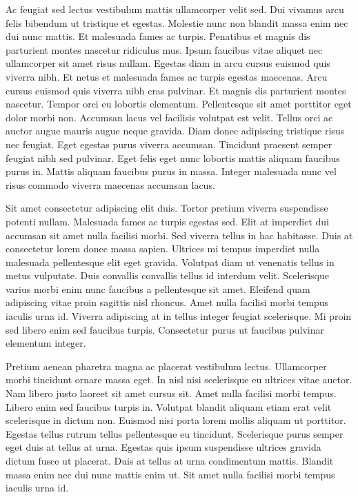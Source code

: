 \documentclass[a4paper,12pt,oneside]{article}
\begin{document}
Ac feugiat sed lectus vestibulum mattis ullamcorper velit sed. Dui vivamus arcu felis bibendum ut tristique et egestas. Molestie nunc non blandit massa enim nec dui nunc mattis. Et malesuada fames ac turpis. Penatibus et magnis dis parturient montes nascetur ridiculus mus. Ipsum faucibus vitae aliquet nec ullamcorper sit amet risus nullam. Egestas diam in arcu cursus euismod quis viverra nibh. Et netus et malesuada fames ac turpis egestas maecenas. Arcu cursus euismod quis viverra nibh cras pulvinar. Et magnis dis parturient montes nascetur. Tempor orci eu lobortis elementum. Pellentesque sit amet porttitor eget dolor morbi non. Accumsan lacus vel facilisis volutpat est velit. Tellus orci ac auctor augue mauris augue neque gravida. Diam donec adipiscing tristique risus nec feugiat. Eget egestas purus viverra accumsan. Tincidunt praesent semper feugiat nibh sed pulvinar. Eget felis eget nunc lobortis mattis aliquam faucibus purus in. Mattis aliquam faucibus purus in massa. Integer malesuada nunc vel risus commodo viverra maecenas accumsan lacus.

Sit amet consectetur adipiscing elit duis. Tortor pretium viverra suspendisse potenti nullam. Malesuada fames ac turpis egestas sed. Elit at imperdiet dui accumsan sit amet nulla facilisi morbi. Sed viverra tellus in hac habitasse. Duis at consectetur lorem donec massa sapien. Ultrices mi tempus imperdiet nulla malesuada pellentesque elit eget gravida. Volutpat diam ut venenatis tellus in metus vulputate. Duis convallis convallis tellus id interdum velit. Scelerisque varius morbi enim nunc faucibus a pellentesque sit amet. Eleifend quam adipiscing vitae proin sagittis nisl rhoncus. Amet nulla facilisi morbi tempus iaculis urna id. Viverra adipiscing at in tellus integer feugiat scelerisque. Mi proin sed libero enim sed faucibus turpis. Consectetur purus ut faucibus pulvinar elementum integer.

Pretium aenean pharetra magna ac placerat vestibulum lectus. Ullamcorper morbi tincidunt ornare massa eget. In nisl nisi scelerisque eu ultrices vitae auctor. Nam libero justo laoreet sit amet cursus sit. Amet nulla facilisi morbi tempus. Libero enim sed faucibus turpis in. Volutpat blandit aliquam etiam erat velit scelerisque in dictum non. Euismod nisi porta lorem mollis aliquam ut porttitor. Egestas tellus rutrum tellus pellentesque eu tincidunt. Scelerisque purus semper eget duis at tellus at urna. Egestas quis ipsum suspendisse ultrices gravida dictum fusce ut placerat. Duis at tellus at urna condimentum mattis. Blandit massa enim nec dui nunc mattis enim ut. Sit amet nulla facilisi morbi tempus iaculis urna id.
\end{document}
